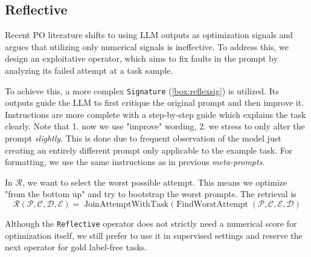 \subsection{Reflective}
Recent PO literature\cite{xiang2025selfsupervisedpromptoptimization} shifts to using LLM outputs as optimization signals
and argues that utilizing only numerical signals is ineffective. To address this, we design an exploitative operator, which
aims to fix faults in the prompt by analyzing its failed attempt at a task sample. 

To achieve this, a more complex \texttt{Signature} (\ref{box:reflexsig}) is utilized. Its outputs guide the LLM to first critique the original prompt
and then improve it. Instructions are more complete with a step-by-step guide which explains the task clearly.
Note that 1. now we use "improve" wording, 2. we stress to only alter the prompt \textit{slightly}. This is done due to 
frequent observation of the model just creating an entirely different prompt only applicable to the example task.
For formatting, we use the same instructions as in previous \textit{meta-prompts}.

In $\mathcal{R}$, we want to select the worst possible attempt. This means we optimize "from the bottom up" and try to bootstrap the
worst prompts. The retrieval is
\begin{equation}
    \mathcal{R}(\mathcal{P}, \mathcal{C}, \mathcal{D}, \mathcal{E}) = \operatorname{JoinAttemptWithTask}(\operatorname{FindWorstAttempt}(\mathcal{P}, \mathcal{C}, \mathcal{E}, \mathcal{D})
\end{equation}

Although the \texttt{Reflective} operator does not strictly need a numerical score for optimization itself,
we still prefer to use it in supervised settings and reserve the next operator for gold label-free tasks. 

